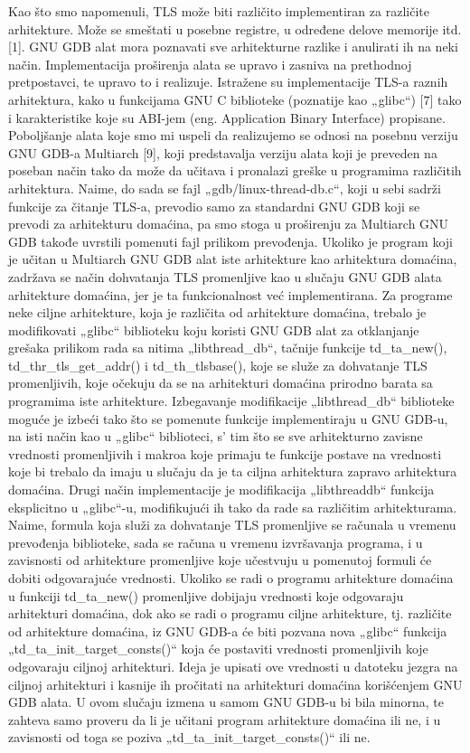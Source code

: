 \documentclass[12pt,oneside]{memoir}
\begin{document}
Kao što smo napomenuli, TLS može biti različito
implementiran za različite arhitekture. Može se smeštati
u posebne registre, u određene delove memorije itd. [1].
GNU GDB alat mora poznavati sve arhitekturne razlike i
anulirati ih na neki način. Implementacija proširenja
alata se upravo i zasniva na prethodnoj pretpostavci, te
upravo to i realizuje. Istražene su implementacije TLS-a
raznih arhitektura, kako u funkcijama GNU C biblioteke
(poznatije kao „glibc“) [7] tako i karakteristike koje su
ABI-jem (eng. Application Binary Interface) propisane.
Poboljšanje alata koje smo mi uspeli da realizujemo se
odnosi na posebnu verziju GNU GDB-a Multiarch [9],
koji predstavalja verziju alata koji je preveden na
poseban način tako da može da učitava i pronalazi
greške u programima različitih arhitektura. Naime, do
sada se fajl „gdb/linux-thread-db.c“, koji u sebi sadrži
funkcije za čitanje TLS-a, prevodio samo za standardni
GNU GDB koji se prevodi za arhitekturu domaćina, pa
smo stoga u proširenju za Multiarch GNU GDB takođe
uvrstili pomenuti fajl prilikom prevođenja. Ukoliko je
program koji je učitan u Multiarch GNU GDB alat iste
arhitekture kao arhitektura domaćina, zadržava se način
dohvatanja TLS promenljive kao u slučaju GNU GDB
alata arhitekture domaćina, jer je ta funkcionalnost već
implementirana. Za programe neke ciljne arhitekture,
koja je različita od arhitekture domaćina, trebalo je
modifikovati „glibc“ biblioteku koju koristi GNU GDB
alat za otklanjanje grešaka prilikom rada sa nitima
„libthread\_db“, tačnije funkcije td\_ta\_new(),
td\_thr\_tls\_get\_addr() i td\_th\_tlsbase(), koje se služe
za dohvatanje TLS promenljivih, koje očekuju da se na
arhitekturi domaćina prirodno barata sa programima iste
arhitekture.
Izbegavanje modifikacije „libthread\_db“ biblioteke
moguće je izbeći tako što se pomenute funkcije
implementiraju u GNU GDB-u, na isti način kao u
„glibc“ biblioteci, s’ tim što se sve arhitekturno zavisne
vrednosti promenljivih i makroa koje primaju te funkcije
postave na vrednosti koje bi trebalo da imaju u slučaju
da je ta ciljna arhitektura zapravo arhitektura domaćina.
Drugi način implementacije je modifikacija „libthreaddb“ funkcija eksplicitno u „glibc“-u, modifikujući ih
tako da rade sa različitim arhitekturama. Naime, formula
koja služi za dohvatanje TLS promenljive se računala u
vremenu prevođenja biblioteke, sada se računa u
vremenu izvršavanja programa, i u zavisnosti od
arhitekture promenljive koje učestvuju u pomenutoj
formuli će dobiti odgovarajuće vrednosti. Ukoliko se
radi o programu arhitekture domaćina u funkciji
td\_ta\_new() promenljive dobijaju vrednosti koje
odgovaraju arhitekturi domaćina, dok ako se radi o
programu ciljne arhitekture, tj. različite od arhitekture
domaćina, iz GNU GDB-a će biti pozvana nova „glibc“
funkcija „td\_ta\_init\_target\_consts()“ koja će postaviti
vrednosti promenljivih koje odgovaraju ciljnoj
arhitekturi. Ideja je upisati ove vrednosti u datoteku
jezgra na ciljnoj arhitekturi i kasnije ih pročitati na
arhitekturi domaćina korišćenjem GNU GDB alata. U
ovom slučaju izmena u samom GNU GDB-u bi bila
minorna, te zahteva samo proveru da li je učitani
program arhitekture domaćina ili ne, i u zavisnosti od
toga se poziva „td\_ta\_init\_target\_consts()“ ili ne.
\end{document}
